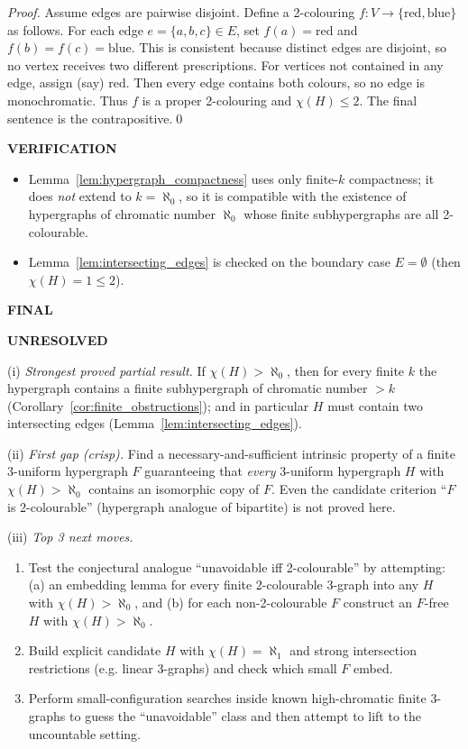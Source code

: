\emph{Proof.}
Assume edges are pairwise disjoint.
Define a 2-colouring $f:V\to\{\text{red},\text{blue}\}$ as follows.
For each edge $e=\{a,b,c\}\in E$, set $f(a)=\text{red}$ and $f(b)=f(c)=\text{blue}$.
This is consistent because distinct edges are disjoint, so no vertex receives two different prescriptions.
For vertices not contained in any edge, assign (say) $\text{red}$.
Then every edge contains both colours, so no edge is monochromatic.
Thus $f$ is a proper 2-colouring and $\chi(H)\le 2$.
The final sentence is the contrapositive.\qed

\bigskip
\noindent\textbf{VERIFICATION}

\begin{itemize}
\item Lemma~\ref{lem:hypergraph_compactness} uses only finite-$k$ compactness; it does \emph{not} extend to $k=\aleph_0$, so it is compatible with the existence of hypergraphs of chromatic number $\aleph_0$ whose finite subhypergraphs are all 2-colourable.
\item Lemma~\ref{lem:intersecting_edges} is checked on the boundary case $E=\emptyset$ (then $\chi(H)=1\le 2$).
\end{itemize}

\bigskip
\noindent\textbf{FINAL}

\textbf{UNRESOLVED}

(i) \emph{Strongest proved partial result.}
If $\chi(H)>\aleph_0$, then for every finite $k$ the hypergraph contains a finite subhypergraph of chromatic number $>k$ (Corollary~\ref{cor:finite_obstructions}); and in particular $H$ must contain two intersecting edges (Lemma~\ref{lem:intersecting_edges}).

(ii) \emph{First gap (crisp).}
Find a necessary-and-sufficient intrinsic property of a finite 3-uniform hypergraph $F$ guaranteeing that \emph{every} 3-uniform hypergraph $H$ with $\chi(H)>\aleph_0$ contains an isomorphic copy of $F$.
Even the candidate criterion ``$F$ is 2-colourable'' (hypergraph analogue of bipartite) is not proved here.

(iii) \emph{Top 3 next moves.}
\begin{enumerate}
\item Test the conjectural analogue ``unavoidable iff 2-colourable'' by attempting: (a) an embedding lemma for every finite 2-colourable 3-graph into any $H$ with $\chi(H)>\aleph_0$, and (b) for each non-2-colourable $F$ construct an $F$-free $H$ with $\chi(H)>\aleph_0$.
\item Build explicit candidate $H$ with $\chi(H)=\aleph_1$ and strong intersection restrictions (e.g. linear 3-graphs) and check which small $F$ embed.
\item Perform small-configuration searches inside known high-chromatic finite 3-graphs to guess the ``unavoidable'' class and then attempt to lift to the uncountable setting.
\end{enumerate}

